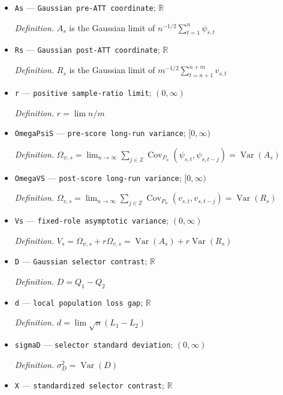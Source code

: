 \documentclass{article}
\begin{document}
\begin{itemize}
  \item \texttt{As} --- \texttt{Gaussian pre-\allowbreak{}ATT coordinate}; \(\mathbb R\)
  \par\smallskip\noindent\emph{Definition.} \(A_s\) is the Gaussian limit of \(n^{-1/2}\sum_{t=1}^n\psi_{s,t}\)
  \item \texttt{Rs} --- \texttt{Gaussian post-\allowbreak{}ATT coordinate}; \(\mathbb R\)
  \par\smallskip\noindent\emph{Definition.} \(R_s\) is the Gaussian limit of \(m^{-1/2}\sum_{t=n+1}^{n+m}v_{s,t}\)
  \item \texttt{r} --- \texttt{positive sample-\allowbreak{}ratio limit}; \((0,\infty)\)
  \par\smallskip\noindent\emph{Definition.} \(r=\lim n/m\)
  \item \texttt{OmegaPsiS} --- \texttt{pre-\allowbreak{}score long-\allowbreak{}run variance}; \([0,\infty)\)
  \par\smallskip\noindent\emph{Definition.} \(\Omega_{\psi,s}=\lim_{n\to\infty}\sum_{j\in\mathbb Z}\operatorname{Cov}_{P_n}(\psi_{s,t},\psi_{s,t-j})=\operatorname{Var}(A_s)\)
  \item \texttt{OmegaVS} --- \texttt{post-\allowbreak{}score long-\allowbreak{}run variance}; \([0,\infty)\)
  \par\smallskip\noindent\emph{Definition.} \(\Omega_{v,s}=\lim_{n\to\infty}\sum_{j\in\mathbb Z}\operatorname{Cov}_{P_n}(v_{s,t},v_{s,t-j})=\operatorname{Var}(R_s)\)
  \item \texttt{Vs} --- \texttt{fixed-\allowbreak{}role asymptotic variance}; \((0,\infty)\)
  \par\smallskip\noindent\emph{Definition.} \(V_s=\Omega_{\psi,s}+r\Omega_{v,s}=\operatorname{Var}(A_s)+r\operatorname{Var}(R_s)\)
  \item \texttt{D} --- \texttt{Gaussian selector contrast}; \(\mathbb R\)
  \par\smallskip\noindent\emph{Definition.} \(D=Q_1-Q_2\)
  \item \texttt{d} --- \texttt{local population loss gap}; \(\mathbb R\)
  \par\smallskip\noindent\emph{Definition.} \(d=\lim\sqrt n(L_1-L_2)\)
  \item \texttt{sigmaD} --- \texttt{selector standard deviation}; \((0,\infty)\)
  \par\smallskip\noindent\emph{Definition.} \(\sigma_D^2=\operatorname{Var}(D)\)
  \item \texttt{X} --- \texttt{standardized selector contrast}; \(\mathbb R\)

\end{itemize}
\end{document}
